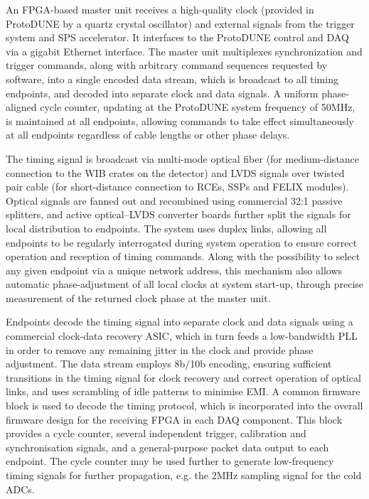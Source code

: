 An FPGA-based master unit receives a high-quality clock (provided in
ProtoDUNE by a quartz crystal oscillator) and external signals from the
trigger system and SPS accelerator. It interfaces to the ProtoDUNE control
and DAQ via a gigabit Ethernet interface. The master unit multiplexes
synchronization and trigger commands, along with arbitrary command
sequences requested by software, into a single encoded data stream,
which is broadcast to all timing endpoints, and decoded into separate clock
and data signals. A uniform phase-aligned cycle counter, updating at the
ProtoDUNE system frequency of 50MHz, is maintained at all endpoints,
allowing commands to take effect simultaneously at all endpoints
regardless of cable lengths or other phase delays.

The timing signal is broadcast via multi-mode optical fiber (for
medium-distance connection to the WIB crates on the detector) and LVDS
signals over twisted pair cable (for short-distance connection to RCEs,
SSPs and FELIX modules). Optical signals are fanned out and recombined
using commercial 32:1 passive splitters, and active optical--LVDS
converter boards further split the signals for local distribution to
endpoints. The system uses duplex links, allowing all endpoints to be
regularly interrogated during system operation to ensure correct operation
and reception of timing commands. Along with the possibility to select
any given endpoint via a unique network address, this mechanism also
allows automatic phase-adjustment of all local clocks at system start-up,
through precise measurement of the returned clock phase at the master unit.

Endpoints decode the timing signal into separate clock and data
signals using a commercial clock-data recovery ASIC, which in turn
feeds a low-bandwidth PLL in order to remove any remaining jitter in
the clock and provide phase adjustment. The data stream employs 8b/10b
encoding, ensuring sufficient transitions in the timing signal for clock
recovery and correct operation of optical links, and uses scrambling
of idle patterns to minimise EMI. A common firmware block is used to
decode the timing protocol, which is incorporated into the overall
firmware design for the receiving FPGA in each DAQ component. This
block provides a cycle counter, several independent trigger, calibration and 
synchronisation signals, and a general-purpose packet data output to each endpoint.
The cycle counter may be used further to generate low-frequency timing signals for
further propagation, e.g. the 2MHz sampling signal for the cold ADCs.

